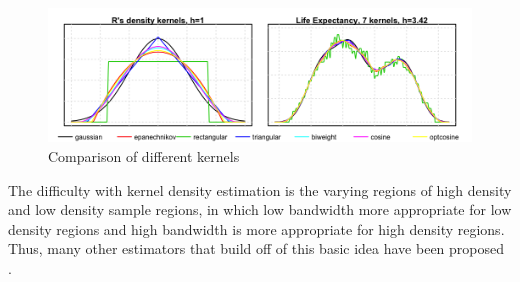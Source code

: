 \documentclass[12pt]{article}
\begin{document}
\begin{figure}[h]
\caption{Comparison of different kernels}
\includegraphics[scale=.4]{fig2}
\centering
\end{figure}

The difficulty with kernel density estimation is the varying regions of
high density and low density sample regions, in which low bandwidth more
appropriate for low density regions and high bandwidth is more
appropriate for high density regions. Thus, many other estimators that
build off of this basic idea have been proposed
\citep{silverman2018density, MACK19791, silverman1982estimation, mack1979multivariate}.
\end{document}
